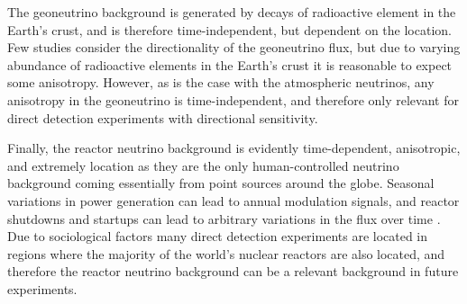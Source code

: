 \documentclass[b5paper, 10pt, twoside]{book}
\begin{document}
The geoneutrino background is generated by decays of radioactive element in the Earth's crust, and is therefore time-independent, but dependent on the location. Few studies consider the directionality of the geoneutrino flux, but due to varying abundance of radioactive elements in the Earth's crust it is reasonable to expect some anisotropy. However, as is the case with the atmospheric neutrinos, any anisotropy in the geoneutrino is time-independent, and therefore only relevant for direct detection experiments with directional sensitivity.

Finally, the reactor neutrino background is evidently time-dependent, anisotropic, and extremely location as they are the only human-controlled neutrino background coming essentially from point sources around the globe. Seasonal variations in power generation can lead to annual modulation signals, and reactor shutdowns and startups can lead to arbitrary variations in the flux over time \parencite{Baldoncini2015}. Due to sociological factors many direct detection experiments are located in regions where the majority of the world's nuclear reactors are also located, and therefore the reactor neutrino background can be a relevant background in future experiments.
\end{document}
